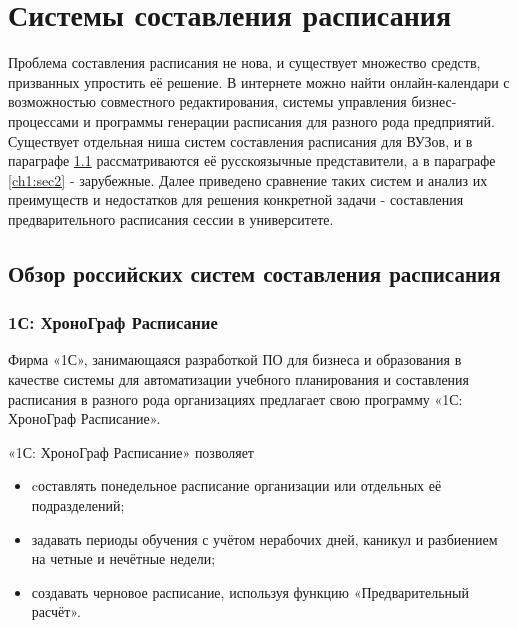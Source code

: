 \chapter{Системы составления расписания} \label{ch1}


Проблема составления расписания не нова, и существует множество средств, призванных упростить её решение. В интернете можно найти онлайн-календари с возможностью совместного редактирования, системы управления бизнес-процессами и программы генерации расписания для разного рода предприятий. Существует отдельная ниша систем составления расписания для ВУЗов, и в параграфе \ref{ch1:sec1} рассматриваются её русскоязычные представители, а в параграфе \ref{ch1:sec2} - зарубежные. Далее приведено сравнение таких систем и анализ их преимуществ и недостатков для решения конкретной задачи - составления предварительного расписания сессии в университете.


\section{Обзор российских систем составления расписания} \label{ch1:sec1}


\subsection{1С: ХроноГраф Расписание} %
\cite{https://1c.ru/rus/products/1c/predpr/compat/catalog/solution.jsp?SolutionID=15710}
Фирма «1С», занимающаяся разработкой ПО для бизнеса и образования в качестве системы для автоматизации учебного планирования и составления расписания в разного рода организациях предлагает свою программу «1С: ХроноГраф Расписание».

«1С: ХроноГраф Расписание» позволяет 
\begin{itemize}
	\item cоставлять понедельное расписание организации или отдельных её подразделений;
	\item задавать периоды обучения с учётом нерабочих дней, каникул и разбиением на четные и нечётные недели;
	\item создавать черновое расписание, используя функцию «Предварительный расчёт».
\end{itemize}

